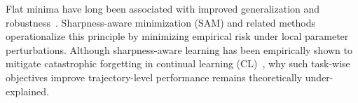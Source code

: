 \documentclass{article}
\begin{document}
Flat minima have long been associated with improved generalization and robustness~\cite{FlatMinima1997,wu2017understandinggeneralizationdeeplearning,chaudhariEntropySGDBiasingGradient2019,NEURIPS2021_995f5e03,JMLRAnEmpiricalInvestigatio,yangRevisitingFlatnessAwareOptimization2025}.
Sharpness-aware minimization (SAM) and related methods~\cite{foretSharpnessAwareMinimizationEfficiently2021,pmlr-v151-bisla22a,Zhang_GAM,NEURIPS2024_C-Flat} operationalize this principle by minimizing empirical risk under local parameter perturbations.
Although sharpness-aware learning has been empirically shown to mitigate catastrophic forgetting in continual learning (CL)~\cite{shiOvercomingCatastrophicForgetting2021,NEURIPS2020_518a38cc,liRevisitingCatastrophicForgetting2024,RevisitFlatnessOGD}, why such task-wise objectives improve trajectory-level performance remains theoretically under-explained.
\end{document}
